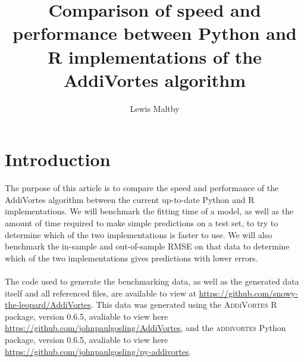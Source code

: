 \documentclass[11pt,twoside,a4paper]{article}
\title{Comparison of speed and performance between Python and R implementations of the AddiVortes algorithm}
\author{Lewis Maltby}
\begin{document}
\maketitle
\section{Introduction}

The purpose of this article is to compare the speed and performance of the AddiVortes algorithm between the current up-to-date Python and R implementations. We will benchmark the fitting time of a model, as well as the amount of time required to make simple predictions on a test set, to try to determine which of the two implementations is faster to use. We will also benchmark the in-sample and out-of-sample RMSE on that data to determine which of the two implementations gives predictions with lower errors.
\\\\
The code used to generate the benchmarking data, as well as the generated data itself and all referenced files, are available to view at \url{https://github.com/snowy-the-leopard/AddiVortes}. This data was generated using the \textsc{AddiVortes} R package, version 0.6.5, avaliable to view here \url{https://github.com/johnpaulgosling/AddiVortes}, and the \textsc{addivortes} Python package, version 0.6.5, avaliable to view here \url{https://github.com/johnpaulgosling/py-addivortes}.
\end{document}
